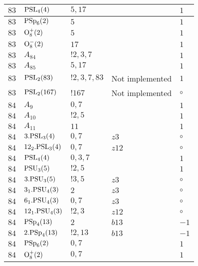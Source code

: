 \documentclass[a4paper, 11pt]{article}
\begin{document}
\begin{longtable}{lllll}
        $ 83 $ & $ {\rm PSL}_{4}(4) $ & $ 5,17 $ & $ ~ $ & $ 1$ \\ \hline
        $ 83 $ & $ {\rm PSp}_{6}(2) $ & $ 5 $ & $ ~ $ & $ 1$ \\ \hline
        $ 83 $ & $ {\rm O}_{8}^+(2) $ & $ 5 $ & $ ~ $ & $ 1$ \\ \hline
        $ 83 $ & $ {\rm O}_{8}^-(2) $ & $ 17 $ & $ ~ $ & $ 1$ \\ \hline
        $ 83 $ & $ A_{84} $ & $ !2, 3, 7 $ & $ ~ $ & $ 1$ \\ \hline
        $ 83 $ & $ A_{85} $ & $ 5, 17 $ & $ ~ $ & $ 1$ \\ \hline
        $ 83 $ & $ {\rm PSL}_{2}(83) $ & $ !2, 3, 7, 83 $ &  Not implemented & $ 1$ \\ \hline
        $ 83 $ & $ {\rm PSL}_{2}(167) $ & $ !167 $ &  Not implemented &  $\circ$ \\ \hline
        $ 84 $ & $ A_{9} $ & $ 0,7 $ & $ ~ $ & $ 1$ \\ \hline
        $ 84 $ & $ A_{10} $ & $ ! 2,5 $ & $ ~ $ & $ 1$ \\ \hline
        $ 84 $ & $ A_{11} $ & $ 11 $ & $ ~ $ & $ 1$ \\ \hline
        $ 84 $ & $ 3.{\rm PSL}_{3}(4) $ & $ 0,7 $ & $ z3 $ &  $\circ$ \\ \hline
        $ 84 $ & $ 12_2.{\rm PSL}_{3}(4) $ & $ 0,7 $ & $ z12 $ &  $\circ$ \\ \hline
        $ 84 $ & $ {\rm PSL}_{4}(4) $ & $ 0,3,7 $ & $ ~ $ & $ 1$ \\ \hline
        $ 84 $ & $ {\rm PSU}_{3}(5) $ & $ ! 2,5 $ & $ ~ $ & $ 1$ \\ \hline
        $ 84 $ & $ 3.{\rm PSU}_{3}(5) $ & $ ! 3,5 $ & $ z3 $ &  $\circ$ \\ \hline
        $ 84 $ & $ 3_1.{\rm PSU}_{4}(3) $ & $ 2 $ & $ z3 $ &  $\circ$ \\ \hline
        $ 84 $ & $ 6_1.{\rm PSU}_{4}(3) $ & $ 0,7 $ & $ z3 $ &  $\circ$ \\ \hline
        $ 84 $ & $ 12_1.{\rm PSU}_{4}(3) $ & $ ! 2,3 $ & $ z12 $ &  $\circ$ \\ \hline
        $ 84 $ & $ {\rm PSp}_{4}(13) $ & $ 2 $ & $ b13 $ & $ -1$ \\ \hline
        $ 84 $ & $ 2.{\rm PSp}_{4}(13) $ & $ ! 2,13 $ & $ b13 $ & $ -1$ \\ \hline
        $ 84 $ & $ {\rm PSp}_{6}(2) $ & $ 0,7 $ & $ ~ $ & $ 1$ \\ \hline
        $ 84 $ & $ {\rm O}_{8}^+(2) $ & $ 0,7 $ & $ ~ $ & $ 1$ \\ \hline

\end{longtable}
\end{document}
